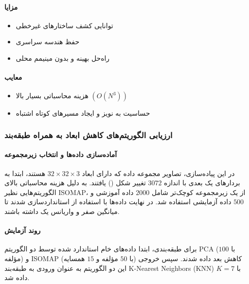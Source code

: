 \documentclass{article}
\begin{document}
\paragraph{مزایا}
\begin{itemize}
	\item توانایی کشف ساختارهای غیرخطی  
	\item حفظ هندسه سراسری  
	\item راه‌حل بهینه و بدون مینیمم محلی  
\end{itemize}

\paragraph{معایب}
\begin{itemize}
	\item هزینه محاسباتی بسیار بالا \((O(N^3))\)  
	\item حساسیت به نویز و ایجاد مسیرهای کوتاه اشتباه   
\end{itemize}
\subsubsection{ارزیابی الگوریتم‌های کاهش ابعاد  به همراه طبقه‌بند }

\paragraph{آماده‌سازی داده‌ها و انتخاب زیرمجموعه}
در این پیاده‌سازی، تصاویر مجموعه داده  که دارای ابعاد $32 \times 32 \times 3$ هستند، ابتدا به بردارهای یک ‌بعدی با اندازه $3072$ تغییر شکل () یافتند. به دلیل هزینه محاسباتی بالای الگوریتم‌هایی نظیر ISOMAP، از یک زیرمجموعه کوچک‌تر شامل $2000$ داده آموزشی و $500$ داده آزمایشی استفاده شد. در نهایت داده‌ها با استفاده از  استانداردسازی شدند تا میانگین صفر و واریانس یک داشته باشند.

\paragraph{روند آزمایش}
برای طبقه‌بندی، ابتدا داده‌های خام استاندارد شده توسط دو الگوریتم PCA (با $100$ مؤلفه) و ISOMAP (با $50$ مؤلفه و $15$ همسایه) کاهش بعد داده شدند. سپس خروجی این دو الگوریتم به عنوان ورودی به طبقه‌بند K-Nearest Neighbors (KNN) با $K=7$ داده شد. 
\end{document}
